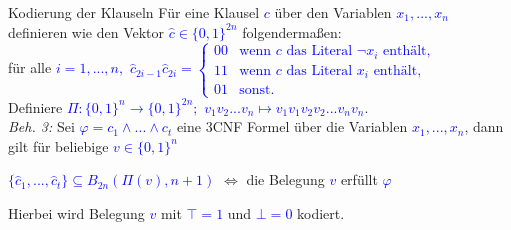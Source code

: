 \documentclass[10pt, aspectratio=169]{beamer}
\begin{document}
\begin{frame}{Kodierung der Klauseln}
Für eine Klausel \textcolor{blue}{$c$} über den Variablen \textcolor{blue}{$x_1,...,x_n$} definieren wie den Vektor \textcolor{blue}{$\hat{c}\in \{0,1\}^{2n}$} folgendermaßen:
\\
für alle \textcolor{blue}{$i = 1,...,n,$} \textcolor{blue}{$\hat{c}_{2i-1}\hat{c}_{2i}=
\begin{cases}
00 & \text{wenn } c \text{ das Literal } \neg x_i \text{ enthält},\\
11 & \text{wenn } c \text{ das Literal } x_i \text{ enthält},\\
01 & \text{sonst}.
\end{cases}$}
\vspace{1em}\\
Definiere \textcolor{blue}{$\Pi: \{0,1\}^n \to \{0,1\}^{2n};$} \textcolor{blue}{$v_1v_2...v_n \mapsto v_1v_1v_2v_2...v_nv_n$}.\\
\vspace{1em}
\textit{Beh. 3:} Sei \textcolor{blue}{$\varphi = c_1 \land ... \land c_t$} eine 3CNF Formel über die Variablen \textcolor{blue}{$x_1,...,x_n$}, dann gilt für beliebige \textcolor{blue}{$v \in \{0,1\}^n$}\\
\begin{center}
    \textcolor{blue}{$\{\hat{c}_1,...,\hat{c}_t\} \subseteq B_{2n}(\Pi(v), n+1)$ }$\Leftrightarrow$ die Belegung \textcolor{blue}{$v$} erfüllt \textcolor{blue}{$\varphi$}
\end{center}
Hierbei wird Belegung \textcolor{blue}{$v$} mit \textcolor{blue}{$\top = 1$} und \textcolor{blue}{$\bot = 0$} kodiert.

\end{frame}
\end{document}
